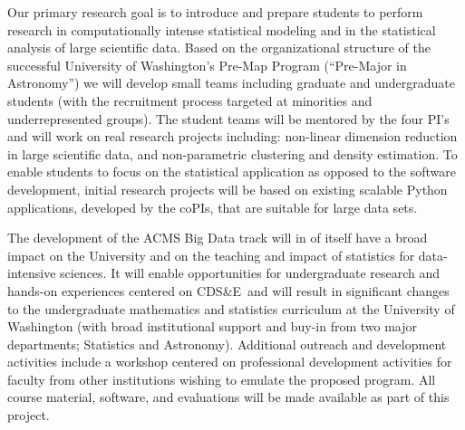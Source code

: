 \documentclass[nofootbib,floatfix,11pt]{article}
\newcommand{\cdse}{CDS\&E}
\begin{document}

Our primary research goal is to introduce and prepare students to
perform research in computationally intense statistical modeling and
in the statistical analysis of large scientific data. Based on the
organizational structure of the successful University of Washington's
Pre-Map Program (``Pre-Major in Astronomy'') we will develop small
teams including graduate and undergraduate students (with the
recruitment process targeted at minorities and underrepresented
groups).  The student teams will be mentored by the four PI's and will
work on real research projects including: non-linear dimension
reduction in large scientific data, and non-parametric clustering and
density estimation. To enable students to focus on the statistical
application as opposed to the software development, initial research
projects will be based on existing scalable Python applications,
developed by the coPIs, that are suitable for large data sets.

The development of the ACMS Big Data track will in of itself have a
broad impact on the University and on the teaching and impact of
statistics for data-intensive sciences. It will enable opportunities
for undergraduate research and hands-on experiences centered on \cdse\
and will result in significant changes to the undergraduate
mathematics and statistics curriculum at the University of Washington
(with broad institutional support and buy-in from two major
departments; Statistics and Astronomy). Additional outreach and
development activities include a workshop centered on professional
development activities for faculty from other institutions wishing to
emulate the proposed program. All course material, software, and
evaluations will be made available as part of this project. 
\end{document}
